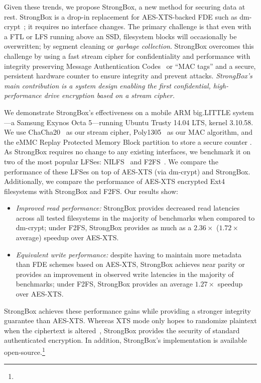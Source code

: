 Given these trends, we propose StrongBox, a new method for securing data at
rest. StrongBox is a drop-in replacement for AES-XTS-backed FDE such as
dm-crypt~\cite{dmcrypt}; \ie it requires no interface changes. The primary
challenge is that even with a FTL or LFS running above an SSD, filesystem blocks
will occasionally be overwritten; \eg by segment cleaning or \emph{garbage
collection}. StrongBox overcomes this challenge by using a fast stream cipher
for confidentiality and performance with integrity preserving Message
Authentication Codes~\cite{MAC} or ``MAC tags'' and a secure, persistent
hardware counter to ensure integrity and prevent attacks. \emph{StrongBox's main
contribution is a system design enabling the first confidential, high-
performance drive encryption based on a stream cipher.}

We demonstrate StrongBox's effectiveness on a mobile ARM big.LITTLE system---a
Samsung Exynos Octa 5---running Ubuntu Trusty 14.04 LTS, kernel 3.10.58. We use
ChaCha20~\cite{ChaCha20} as our stream cipher, Poly1305~\cite{Poly1305} as our
MAC algorithm, and the eMMC Replay Protected Memory Block partition to store a
secure counter \cite{eMMC-standard}. As StrongBox requires no change to any
existing interfaces, we benchmark it on two of the most popular LFSes:
NILFS~\cite{NILFS} and F2FS~\cite{F2FS}. We compare the performance of these
LFSes on top of AES-XTS (via dm-crypt) and StrongBox. Additionally, we compare
the performance of AES-XTS encrypted Ext4 filesystems with StrongBox and F2FS.
Our results show:

\begin{itemize}

  \item \emph{Improved read performance:} StrongBox provides decreased read
latencies across all tested filesystems in the majority of benchmarks when
compared to dm-crypt; \eg under F2FS, StrongBox provides as much as a
$2.36\times$ ($1.72\times$ average) speedup over AES-XTS\@.

  \item \emph{Equivalent write performance:} despite having to maintain more
metadata than FDE schemes based on AES-XTS, StrongBox achieves near parity or
provides an improvement in observed write latencies in the majority of
benchmarks; \eg under F2FS, StrongBox provides an average $1.27\times$ speedup
over AES-XTS\@.

\end{itemize}

StrongBox achieves these performance gains while providing a stronger integrity
guarantee than AES-XTS\@. Whereas XTS mode only hopes to randomize plaintext when
the ciphertext is altered~\cite{XTS}, StrongBox provides the security of
standard authenticated encryption. In addition, StrongBox's implementation is
available open-source.\footnote{\StrongBoxURI}
